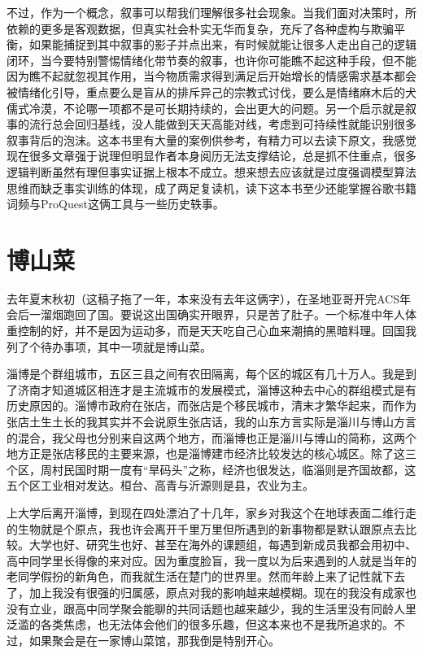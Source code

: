 \documentclass[
]{book}
\begin{document}
不过，作为一个概念，叙事可以帮我们理解很多社会现象。当我们面对决策时，所依赖的更多是客观数据，但真实社会朴实无华而复杂，充斥了各种虚构与欺骗平衡，如果能捕捉到其中叙事的影子并点出来，有时候就能让很多人走出自己的逻辑闭环，当今要特别警惕情绪化带节奏的叙事，也许你可能瞧不起这种手段，但不能因为瞧不起就忽视其作用，当今物质需求得到满足后开始增长的情感需求基本都会被情绪化引导，重点要么是盲从的排斥异己的宗教式讨伐，要么是情绪麻木后的犬儒式冷漠，不论哪一项都不是可长期持续的，会出更大的问题。另一个启示就是叙事的流行总会回归基线，没人能做到天天高能对线，考虑到可持续性就能识别很多叙事背后的泡沫。这本书里有大量的案例供参考，有精力可以去读下原文，我感觉现在很多文章强于说理但明显作者本身阅历无法支撑结论，总是抓不住重点，很多逻辑判断虽然有理但事实证据上根本不成立。想来想去应该就是过度强调模型算法思维而缺乏事实训练的体现，成了两足复读机，读下这本书至少还能掌握谷歌书籍词频与ProQuest这俩工具与一些历史轶事。

\hypertarget{ux535aux5c71ux83dc}{%
\section{博山菜}\label{ux535aux5c71ux83dc}}

去年夏末秋初（这稿子拖了一年，本来没有去年这俩字），在圣地亚哥开完ACS年会后一溜烟跑回了国。要说这出国确实开眼界，只是苦了肚子。一个标准中年人体重控制的好，并不是因为运动多，而是天天吃自己心血来潮搞的黑暗料理。回国我列了个待办事项，其中一项就是博山菜。

淄博是个群组城市，五区三县之间有农田隔离，每个区的城区有几十万人。我是到了济南才知道城区相连才是主流城市的发展模式，淄博这种去中心的群组模式是有历史原因的。淄博市政府在张店，而张店是个移民城市，清末才繁华起来，而作为张店土生土长的我其实并不会说原生张店话，我的山东方言实际是淄川与博山方言的混合，我父母也分别来自这两个地方，而淄博也正是淄川与博山的简称，这两个地方正是张店移民的主要来源，也是淄博建市经济比较发达的核心城区。除了这三个区，周村民国时期一度有``旱码头''之称，经济也很发达，临淄则是齐国故都，这五个区工业相对发达。桓台、高青与沂源则是县，农业为主。

上大学后离开淄博，到现在四处漂泊了十几年，家乡对我这个在地球表面二维行走的生物就是个原点，我也许会离开千里万里但所遇到的新事物都是默认跟原点去比较。大学也好、研究生也好、甚至在海外的课题组，每遇到新成员我都会用初中、高中同学里长得像的来对应。因为重度脸盲，我一度以为后来遇到的人就是当年的老同学假扮的新角色，而我就生活在楚门的世界里。然而年龄上来了记性就下去了，加上我没有很强的归属感，原点对我的影响越来越模糊。现在的我没有成家也没有立业，跟高中同学聚会能聊的共同话题也越来越少，我的生活里没有同龄人里泛滥的各类焦虑，也无法体会他们的很多乐趣，但这本来也不是我所追求的。不过，如果聚会是在一家博山菜馆，那我倒是特别开心。
\end{document}
